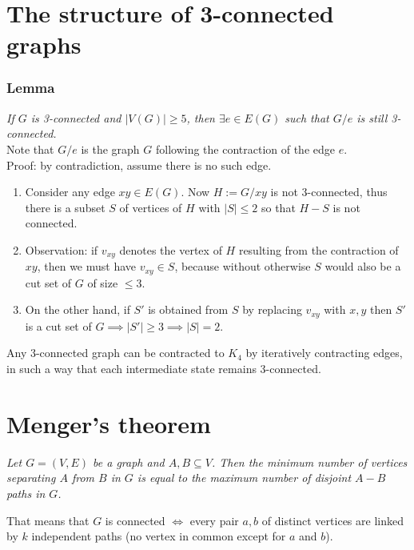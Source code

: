 \documentclass[11pt]{book}
\begin{document}
		
	\section{The structure of 3-connected graphs}
		\subsubsection{Lemma} 
		\textit{If $G$ is 3-connected and $|V(G)| \geq 5$, then $\exists e \in E (G)$ such that $G / e$ is still 3-connected.}\\
		
		Note that $G / e$ is the graph $G$ following the contraction of the edge $e$.\\
		
		Proof: by contradiction, assume there is no such edge.
		\begin{enumerate}
			\item Consider any edge $xy \in E(G)$. Now $H := G / xy$ is not 3-connected, thus there is a subset $S$ of vertices of $H$ with $|S| \leq 2$ so that $H - S$ is not connected. 
			\item Observation: if $v_{xy}$ denotes the vertex of $H$ resulting from the contraction of $xy$, then we must have $v_{xy} \in S$, because without otherwise $S$ would also be a cut set of $G$ of size $\leq 3$.
			\item On the  other hand, if $S'$ is obtained from $S$ by replacing $v_{xy}$ with $x,y$ then $S'$ is a cut set of $G \implies |S'| \geq 3 \implies |S| = 2$.
		\end{enumerate}
		
		Any 3-connected graph can be contracted to $K_4$ by iteratively contracting edges, in such a way that each intermediate state remains 3-connected.
		
		
	\section{Menger's theorem}
		\textit{Let $G = (V,E)$ be a graph and $A, B \subseteq V$. Then the minimum number of vertices separating $A$ from $B$ in $G$ is equal to the maximum number of disjoint $A-B$ paths in $G$.\\}
		
		That means that $G$ is connected $\iff$ every pair $a,b$ of distinct vertices are linked by $k$ independent paths (no vertex in common except for $a$ and $b$). 
		
\end{document}
